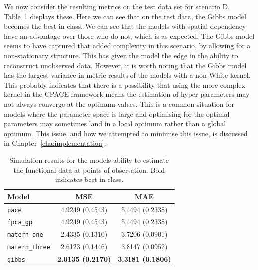 We now consider the resulting metrics on the test data set for scenario D.
Table~\ref{tab:test_D} displays these.
Here we can see that on the test data, the Gibbs model becomes the best in class.
We can see that the models with spatial dependency have an advantage over those who do not, which is as expected.
The Gibbs model seems to have captured that added complexity in this scenario, by allowing for a non-stationary structure. 
This has given the model the edge in the ability to reconstruct unobserved data.
However, it is worth noting that the Gibbs model has the largest variance in metric results of the models with a non-White kernel.
This probably indicates that there is a possibility that using the more complex kernel in the CPACE framework means the estimation of hyper parameters may not always converge at the optimum values.
This is a common situation for models where the parameter space is large and optimising for the optimal parameters may sometimes land in a local optimum rather than a global optimum. 
This issue, and how we attempted to minimise this issue, is discussed in Chapter~\ref{cha:implementation}.

\begin{table}[b]
	\caption[Simulation results for Scenario D on observed data]{Simulation results for the models ability to estimate the functional data at points of observation. Bold indicates best in class.}
	\centering
	\label{tab:test_D}
	\begin{tabular}{lcc}
		\toprule
		\textbf{Model} & \textbf{MSE} & \textbf{MAE} \\
		\midrule
		\verb*|pace| & 4.9249 (0.4543)& 5.4494 (0.2338)\\
		\verb*|fpca_gp| & 4.9249 (0.4543)& 5.4494 (0.2338)\\
		\verb*|matern_one| & 2.4335	(0.1310) & 3.7206 (0.0901) \\
		\verb*|matern_three| & 2.6123 (0.1446)& 3.8147 (0.0952) \\
		\verb*|gibbs| & \textbf{2.0135 (0.2170)} & \textbf{3.3181 (0.1806)}\\
		\bottomrule
	\end{tabular}
\end{table}

